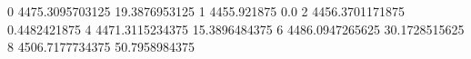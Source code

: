 0 4475.3095703125 19.3876953125
1 4455.921875 0.0
2 4456.3701171875 0.4482421875
4 4471.3115234375 15.3896484375
6 4486.0947265625 30.1728515625
8 4506.7177734375 50.7958984375
